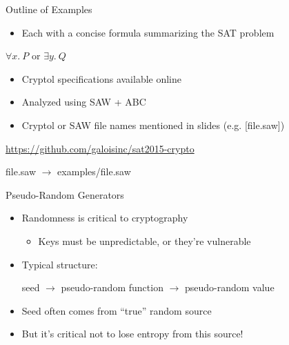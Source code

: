 \documentclass[ignorenonframetext,]{beamer}
\providecommand{\tightlist}{%
  \setlength{\itemsep}{0pt}\setlength{\parskip}{0pt}}
\newcommand{\infile}[1]{{\tiny \alert{[#1]}}}
\newcommand{\filelink}[1]{{\alert{#1}}}
\newcommand{\aurl}[1]{\alert{\url{#1}}}
\begin{document}
\begin{frame}{Outline of Examples}

\begin{itemize}
\tightlist
\item
  Each with a concise formula summarizing the SAT problem
\end{itemize}

\begin{center}
$\forall x.~P$ or $\exists y.~Q$
\end{center}

\begin{itemize}
\item
  Cryptol specifications available online
\item
  Analyzed using SAW + ABC
\item
  Cryptol or SAW file names mentioned in slides (e.g. \infile{file.saw})
\end{itemize}

\begin{center}
\aurl{https://github.com/galoisinc/sat2015-crypto}
\end{center}

\begin{center}
\filelink{file.saw} $\rightarrow$ \filelink{examples/file.saw}
\end{center}

\end{frame}

\begin{frame}{Pseudo-Random Generators}

\begin{itemize}
\tightlist
\item
  Randomness is critical to cryptography

  \begin{itemize}
  \tightlist
  \item
    Keys must be unpredictable, or they're vulnerable
  \end{itemize}
\item
  Typical structure:

  \begin{center}
  seed $\rightarrow$ pseudo-random function $\rightarrow$ pseudo-random value
  \end{center}
\item
  Seed often comes from ``true'' random source
\item
  But it's critical not to lose entropy from this source!
\end{itemize}

\end{frame}
\end{document}
